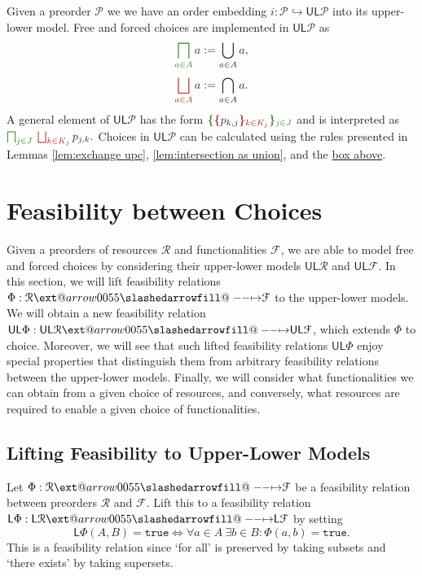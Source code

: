\documentclass[12pt]{article}
\makeatletter
\theoremstyle{definition}
\theoremstyle{plain}
\theoremstyle{plain}
\theoremstyle{plain}
\theoremstyle{plain}
\theoremstyle{remark}
\theoremstyle{remark}
\newcommand{\mc}[1]{\mathcal{#1}}
\newcommand{\low}{\mathsf{L}}
\newcommand{\upper}{\mathsf{U}}
\newcommand{\true}{\mathtt{true}}
\def\slashedarrowfill@#1#2#3#4#5{%
	$\m@th\thickmuskip0mu\medmuskip\thickmuskip\thinmuskip\thickmuskip
	\relax#5#1\mkern-7mu%
	\cleaders\hbox{$#5\mkern-2mu#2\mkern-2mu$}\hfill
	\mathclap{#3}\mathclap{#2}%
	\cleaders\hbox{$#5\mkern-2mu#2\mkern-2mu$}\hfill
	\mkern-7mu#4$%
}
\def\rightslashedarrowfill@{%
	\slashedarrowfill@\relbar\relbar\mapstochar\rightarrow}
\newcommand\xslashedrightarrow[2][]{%
	\ext@arrow 0055{\rightslashedarrowfill@}{#1}{#2}}
\newcommand{\cbigsqcap}[1]{\color{OliveGreen}\bigsqcap_{#1}\color{Black}}
\newcommand{\cbigsqcup}[1]{\color{BrickRed}\bigsqcup_{#1}\color{Black}}
\makeatother
\begin{document}
\begin{tcolorbox}[title=Working in the Upper-lower Model, colframe=Apricot, colback = paleorange, coltitle = Sepia]
Given a preorder $\mc{P}$ we we have an order embedding $i: \mc{P} \hookrightarrow \upper\low\mc{P}$ into its upper-lower model. Free and forced choices are implemented in $\upper\low\mc{P}$ as
$$ \cbigsqcap{a \in A} a :=  \bigcup_{a \in A} a,$$
$$ \cbigsqcup{a \in A} a := \bigcap_{a \in A} a.$$
A general element of $\upper\low\mc{P}$ has the form 
$
\color{OliveGreen} \bm{\{} \color{Black} \color{BrickRed} \bm{\{} \color{Black} p_{k,j} \color{BrickRed} \bm{\}}_{k \in K_j} \color{Black}  \color{OliveGreen} \bm{\}}_{j \in J} \color{Black}
$
and is interpreted as
$\cbigsqcap{j \in J} \: \cbigsqcup{k \in K_j} p_{j,k}.$ Choices in $\upper\low\mc{P}$ can be calculated using the rules presented in Lemmas \ref{lem:exchange upc}, \ref{lem:intersection as union}, and the \hyperlink{box:calc rules}{box above}.
\end{tcolorbox}

\section{Feasibility between Choices}
Given a preorders of resources $\mc{R}$ and functionalities $\mc{F}$, we are able to model free and forced choices by considering their upper-lower models $\upper\low\mc{R}$ and $\upper\low\mc{F}$. In this section, we will lift feasibility relations $\Phi: \mc{R} \xslashedrightarrow{} \mc{F}$ to the upper-lower models. We will obtain a new feasibility relation $\upper\low\Phi: \upper\low\mc{R} \xslashedrightarrow{} \upper\low\mc{F}$, which extends $\Phi$ to choice. Moreover, we will see that such lifted feasibility relations $\upper\low\Phi$ enjoy special properties that distinguish them from arbitrary feasibility relations between the upper-lower models. Finally, we will consider what functionalities we can obtain from a given choice of resources, and conversely, what resources are required to enable a given choice of functionalities.

\subsection{Lifting Feasibility to Upper-Lower Models}\label{sec:lifting feasibility}
Let $\Phi: \mc{R} \xslashedrightarrow{} \mc{F}$ be a feasibility relation between preorders $\mc{R}$ and $\mc{F}$. Lift this to a feasibility relation $\low\Phi: \low\mc{R} \xslashedrightarrow{} \low\mc{F}$ by setting 
$$\low\Phi(A,B) = \true \iff \forall a \in A \: \exists b \in B: \Phi(a,b)=\true.$$
This is a feasibility relation since `for all' is preserved by taking subsets and `there exists' by taking supersets. 
\end{document}
